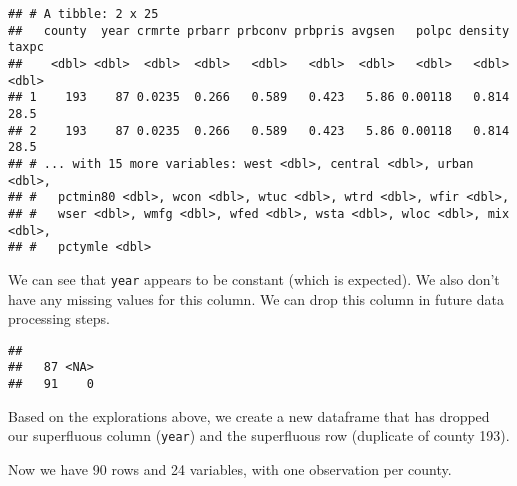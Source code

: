 \documentclass[]{article}
\newenvironment{Shaded}{\begin{snugshade}}{\end{snugshade}}
\newcommand{\CommentTok}[1]{\textcolor[rgb]{0.56,0.35,0.01}{\textit{#1}}}
\newcommand{\DataTypeTok}[1]{\textcolor[rgb]{0.13,0.29,0.53}{#1}}
\newcommand{\KeywordTok}[1]{\textcolor[rgb]{0.13,0.29,0.53}{\textbf{#1}}}
\newcommand{\NormalTok}[1]{#1}
\newcommand{\OperatorTok}[1]{\textcolor[rgb]{0.81,0.36,0.00}{\textbf{#1}}}
\newcommand{\StringTok}[1]{\textcolor[rgb]{0.31,0.60,0.02}{#1}}
\begin{document}
\begin{verbatim}
## # A tibble: 2 x 25
##   county  year crmrte prbarr prbconv prbpris avgsen   polpc density taxpc
##    <dbl> <dbl>  <dbl>  <dbl>   <dbl>   <dbl>  <dbl>   <dbl>   <dbl> <dbl>
## 1    193    87 0.0235  0.266   0.589   0.423   5.86 0.00118   0.814  28.5
## 2    193    87 0.0235  0.266   0.589   0.423   5.86 0.00118   0.814  28.5
## # ... with 15 more variables: west <dbl>, central <dbl>, urban <dbl>,
## #   pctmin80 <dbl>, wcon <dbl>, wtuc <dbl>, wtrd <dbl>, wfir <dbl>,
## #   wser <dbl>, wmfg <dbl>, wfed <dbl>, wsta <dbl>, wloc <dbl>, mix <dbl>,
## #   pctymle <dbl>
\end{verbatim}

We can see that \texttt{year} appears to be constant (which is
expected). We also don't have any missing values for this column. We can
drop this column in future data processing steps.

\begin{Shaded}
\end{Shaded}

\begin{verbatim}
## 
##   87 <NA> 
##   91    0
\end{verbatim}

Based on the explorations above, we create a new dataframe that has
dropped our superfluous column (\texttt{year}) and the superfluous row
(duplicate of county 193).

\begin{Shaded}
\end{Shaded}

Now we have 90 rows and 24 variables, with one observation per county.

\begin{Shaded}
\end{Shaded}
\end{document}
